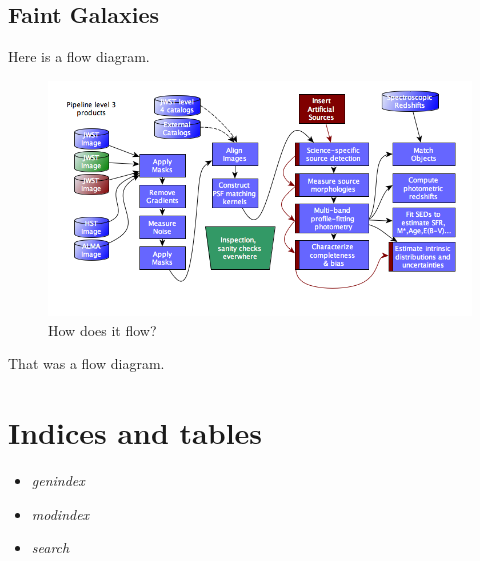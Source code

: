 \documentclass[letterpaper,10pt,english]{sphinxmanual}
\begin{document}
\section{Faint Galaxies}
\label{use_cases:faint-galaxies}
Here is a flow diagram.
\begin{figure}[htbp]
\centering
\capstart

\includegraphics{faint_galaxy_photometry.png}
\caption{How does it flow?}\end{figure}

That was a flow diagram.


\chapter{Indices and tables}
\label{index:indices-and-tables}\label{index::doc}\begin{itemize}
\item {} 
\emph{genindex}

\item {} 
\emph{modindex}

\item {} 
\emph{search}

\end{itemize}



\renewcommand{\indexname}{Index}
\printindex
\end{document}
